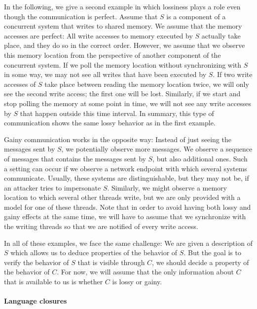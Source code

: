 \documentclass[../../diss.tex]{subfiles}
\begin{document}
In the following, we give a second example in which lossiness plays a role even though the communication is perfect.
Assume that $S$ is a component of a concurrent system that writes to shared memory.
We assume that the memory accesses are perfect: All write accesses to memory executed by $S$ actually take place, and they do so in the correct order.
However, we assume that we observe this memory location from the perspective of another component of the concurrent system.
If we poll the memory location without synchronizing with $S$ in some way, we may not see all writes that have been executed by $S$.
If two write accesses of $S$ take place between reading the memory location twice, we will only see the second write access; the first one will be lost.
Similarly, if we start and stop polling the memory at some point in time, we will not see any write accesses by $S$ that happen outside this time interval.
In summary, this type of communication shows the same lossy behavior as in the first example.

Gainy communication works in the opposite way:
Instead of just seeing the messages sent by $S$, we potentially observe more messages.
We observe a sequence of messages that contains the messages sent by $S$, but also additional ones.
Such a setting can occur if we observe a network endpoint with which several systems communicate.
Usually, these systems are distinguishable, but they may not be, \eg if an attacker tries to impersonate $S$.
Similarly, we might observe a memory location to which several other threads write, but we are only provided with a model for one of these threads.
Note that in order to avoid having both lossy and gainy effects at the same time, we will have to assume that we synchronize with the writing threads so that we are notified of every write access.

In all of these examples, we face the same challenge:
We are given a description of $S$ which allows us to deduce properties of the behavior of $S$.
But the goal is to verify the behavior of $S$ that is visible through $C$, \ie we should decide a property of the behavior of $C$.
For now, we will assume that the only information about $C$ that is available to us is whether $C$ is lossy or gainy.

\paragraph{Language closures}
\end{document}

